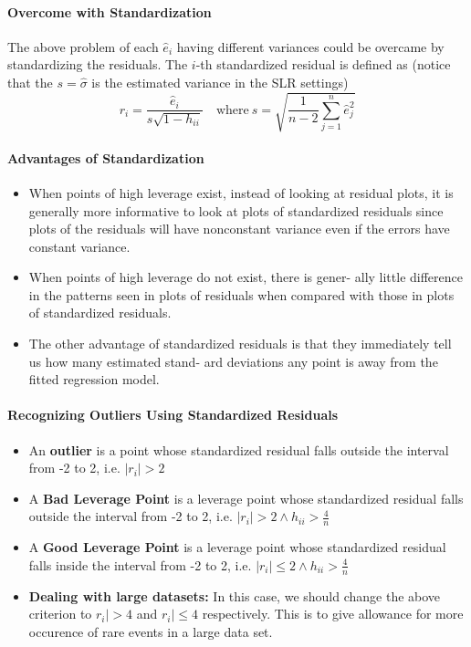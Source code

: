 \documentclass[11pt]{article}
\begin{document}
\paragraph{Overcome with Standardization} The above problem of each $\hat{e}_i$ having different variances could be overcame by standardizing the residuals. The $i$-th standardized residual is defined as (notice that the $s = \hat{\sigma}$ is the estimated variance in the SLR settings)
\begin{equation*}
    r_{i}=\frac{\hat{e}_{i}}{s \sqrt{1-h_{i i}}}\quad \text{where}~ s=\sqrt{\frac{1}{n-2} \sum_{j=1}^{n} \hat{e}_{j}^{2}}
\end{equation*}

\paragraph{Advantages of Standardization} 
\begin{itemize}
    \item When points of high leverage exist, instead of looking at residual plots, it is generally more informative to look at plots of standardized residuals since plots of the residuals will have nonconstant variance even if the errors have constant variance.
    \item When points of high leverage do not exist, there is gener- ally little difference in the patterns seen in plots of residuals when compared with those in plots of standardized residuals.
    \item The other advantage of standardized residuals is that they immediately tell us how many estimated stand- ard deviations any point is away from the fitted regression model. 
\end{itemize}

\paragraph{Recognizing Outliers Using Standardized Residuals} 
\begin{itemize}
    \item An \textbf{outlier} is a point whose standardized residual falls outside the interval from -2 to 2, i.e. $|r_i| > 2$
    \item A \textbf{Bad Leverage Point} is a leverage point whose standardized residual falls outside the interval from -2 to 2, i.e. $|r_i| > 2 \wedge h_{ii} > \frac{4}{n}$
    \item A \textbf{Good Leverage Point} is a leverage point whose standardized residual falls inside the interval from -2 to 2, i.e. $|r_i| \leq 2 \wedge h_{ii} > \frac{4}{n}$
    \item \textbf{Dealing with large datasets:} In this case, we should change the above criterion to $r_i| > 4$ and $r_i| \leq 4$ respectively. This is to give allowance for more occurence of rare events in a large data set.
\end{itemize}
\end{document}
